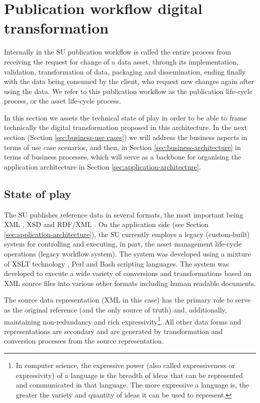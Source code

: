 \section{Publication workflow digital transformation}
\label{sec:context}
    
    Internally in the SU publication workflow is called the entire process from receiving the request for change of a data asset, through its implementation, validation, transformation of data, packaging and dissemination, ending finally with the data being consumed by the client, who request new changes again after using the data. We refer to this publication workflow as the publication life-cycle process, or the asset life-cycle process.
    
    In this section we assets the technical state of play in order to be able to frame technically the digital transformation proposed in this architecture. In the next section (Section \ref{sec:business-use cases}) we will address the business aspects in terms of use case scenarios, and then, in Section \ref{sec:business-architecture} in terms of business processes, which will serve as a backbone for organising the application architecture in Section \ref{sec:application-architecture}.

	\subsection{State of play}
	The SU publishes reference data in several formats, the most important being XML \citep{xml1-spec}, XSD \citep{xsd1.1-spec} and RDF/XML \citep{rdf-xml-Beckett:04:RSS,rdf-xml-Schreiber:14:RXS}. On the application side (see Section \ref{sec:application-architecture}), the SU currently employs a legacy (custom-built) system for controlling and executing, in part, the asset management life-cycle operations (legacy workflow system). The system was developed using a mixture of XSLT technology \cite{xslt3-Kay}, Perl and Bash scripting languages. The system was developed to execute a wide variety of conversions and transformations based on XML source files into various other formats including human readable documents.
	 
	The source data representation (XML in this case) has the primary role to serve as the original reference (and the only source of truth) and, additionally, maintaining non-redundancy and rich expressivity\footnote{In computer science, the expressive power (also called expressiveness or expressivity) of a language is the breadth of ideas that can be represented and communicated in that language. The more expressive a language is, the greater the variety and quantity of ideas it can be used to represent.}. All other data forms and representations are secondary and are generated by transformation and conversion processes from the source representation.
	 
